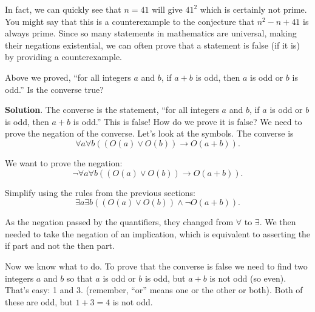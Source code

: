 \documentclass[11pt,]{book}
\theoremstyle{ptxplainnotitle}
\theoremstyle{ptxplaintitle}
\theoremstyle{ptxdefinitionnotitle}
\theoremstyle{ptxdefinitiontitle}
\theoremstyle{ptxdefinitionnotitle}
\theoremstyle{ptxdefinitiontitle}
\theoremstyle{ptxdefinitionnotitle}
\theoremstyle{ptxdefinitiontitle}
\theoremstyle{ptxdefinitiontitlenonumber}
\theoremstyle{ptxdefinitiontitlenonumber}
\numberwithin{equation}{chapter}
\newcommand{\imp}{\rightarrow}
\begin{document}
\par
\hypertarget{p-2586}{}%
In fact, we can quickly see that \(n = 41\) will give \(41^2\) which is certainly not prime. You might say that this is a counterexample to the conjecture that \(n^2 - n + 41\) is always prime. Since so many statements in mathematics are universal, making their negations existential, we can often prove that a statement is false (if it is) by providing a counterexample.%
\begin{example}\label{example-71}
\hypertarget{p-2587}{}%
Above we proved, ``for all integers \(a\) and \(b\), if \(a+b\) is odd, then \(a\) is odd or \(b\) is odd.'' Is the converse true?%
\par\smallskip%
\noindent\textbf{Solution}.\hypertarget{solution-295}{}\quad%
\hypertarget{p-2588}{}%
The converse is the statement, ``for all integers \(a\) and \(b\), if \(a\) is odd or \(b\) is odd, then \(a + b\) is odd.'' This is false! How do we prove it is false? We need to prove the negation of the converse. Let's look at the symbols. The converse is%
\begin{equation*}
\forall a \forall b ((O(a) \vee O(b)) \imp O(a+b)).
\end{equation*}
%
\par
\hypertarget{p-2589}{}%
We want to prove the negation:%
\begin{equation*}
\neg \forall a \forall b ((O(a) \vee O(b)) \imp O(a+b)).
\end{equation*}
%
\par
\hypertarget{p-2590}{}%
Simplify using the rules from the previous sections:%
\begin{equation*}
\exists a \exists b ((O(a) \vee O(b)) \wedge \neg O(a+b)).
\end{equation*}
%
\par
\hypertarget{p-2591}{}%
As the negation passed by the quantifiers, they changed from \(\forall\) to \(\exists\). We then needed to take the negation of an implication, which is equivalent to asserting the if part and not the then part.%
\par
\hypertarget{p-2592}{}%
Now we know what to do. To prove that the converse is false we need to find two integers \(a\) and \(b\) so that \(a\) is odd or \(b\) is odd, but \(a+b\) is not odd (so even). That's easy: 1 and 3. (remember, ``or'' means one or the other or both). Both of these are odd, but \(1+3 = 4\) is not odd.%
\end{example}
\typeout{************************************************}
\typeout{************************************************}
\end{document}
